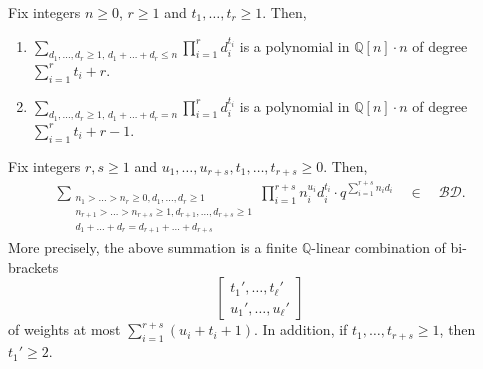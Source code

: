 \documentclass[10pt,a4paper]{amsart}
\newcommand{\BD}{\mathcal {BD}}
\newcommand{\Q}{ \mathbb Q }
\begin{document}
\begin{lemma}  \label{sumofpowers} 
Fix integers $n \ge 0$, $r \ge 1$ and $t_1, \ldots, t_{r} \ge 1$. Then, 
\begin{enumerate}
\item[{\rm (i)}]
$\displaystyle{\sum_{d_1, \ldots, d_r \ge 1, \, d_1+ \ldots + d_r \le n}
  \prod_{i=1}^{r} d_i^{t_i}}$
is a polynomial in $\Q[n] \cdot n$ of degree $\sum_{i=1}^{r} t_i+r$.

\item[{\rm (ii)}]
$\displaystyle{\sum_{d_1, \ldots, d_r \ge 1, \, d_1+ \ldots + d_r = n}
  \prod_{i=1}^{r} d_i^{t_i}}$
is a polynomial in $\Q[n] \cdot n$ of degree $\sum_{i=1}^{r} t_i+r-1$.
\end{enumerate}
\end{lemma}

\begin{lemma}  \label{lemma_t2t1yq} 
Fix integers $r, s \ge 1$ and $u_1, \ldots, u_{r+s}, 
t_1, \ldots, t_{r+s} \ge 0$. Then,
\begin{eqnarray}  \label{lemma_t2t1yq.0}
\sum_{\substack{n_1 > \ldots > n_r \ge 0, d_1, \ldots, d_r \ge 1\\
    n_{r+1} > \ldots > n_{r+s} \ge 1, d_{r+1}, \ldots, d_{r+s} \ge 1\\
    d_1+ \ldots + d_r = d_{r+1} + \ldots + d_{r+s}}}
  \prod_{i=1}^{r+s} n_i^{u_i}d_i^{t_i} \cdot q^{\sum_{i=1}^{r+s} n_i d_i}
\quad \in \quad \BD.
\end{eqnarray}
More precisely, the above summation is a finite $\Q$-linear combination of 
bi-brackets 
$$
\begin{bmatrix} t_1', \ldots, t_\ell'\\u_1', \ldots, u_\ell' \end{bmatrix}
$$
of weights at most $\sum_{i=1}^{r+s} (u_i + t_i+1)$. In addition, 
if $t_1, \ldots, t_{r+s} \ge 1$, then $t_1' \ge 2$. 
\end{lemma}
\end{document}
